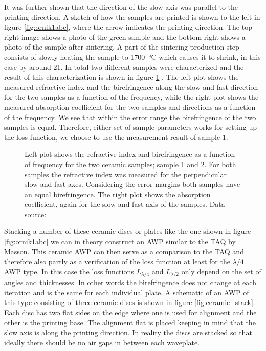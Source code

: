 It was further shown that the direction of the slow axis was parallel to the printing direction. A sketch of how the samples are printed is shown to the left in figure \ref{fig:ornik1abc}, where the arrow indicates the printing direction. The top right image shows a photo of the green sample and the bottom right shows a photo of the sample after sintering. A part of the sintering production step consists of slowly heating the sample to \SI{1700}{\celsius} which causes it to shrink, in this case by around \SI{21}{\volpercent}. In total two different samples were characterized and the result of this characterization is shown in figure \ref{fig:ri_abs} \cite{Ornik2021}. The left plot shows the measured refractive index and the birefringence along the slow and fast direction for the two samples as a function of the frequency, while the right plot shows the measured absorption coefficient for the two samples and directions as a function of the frequency. We see that within the error range the birefringence of the two samples is equal. Therefore, either set of sample parameters works for setting up the loss function, we choose to use the measurement result of sample 1. 

\begin{figure}[ht]
    \centering
    
    \caption{Left plot shows the refractive index and birefringence as a function of frequency for the two ceramic  samples; sample 1 and 2. For both samples the refractive index was measured for the perpendicular slow and fast axes. Considering the error margins both samples have an equal birefringence. The right plot shows the absorption coefficient, again for the slow and fast axis of the samples. Data source: \cite{Ornik2021}}
    \label{fig:ri_abs}
\end{figure}

Stacking a number of these ceramic discs or plates like the one shown in figure \ref{fig:ornik1abc} we can in theory construct an AWP similar to the TAQ by Masson. This ceramic AWP can then serve as a comparison to the TAQ and therefore also partly as a verification of the loss function at least for the $\lambda/4$ AWP type. In this case the loss functions $L_{\lambda/4}$ and $L_{\lambda/2}$ only depend on the set of angles and thicknesses. In other words the birefringence does not change at each iteration and is the same for each individual plate. A schematic of an AWP of this type consisting of three ceramic discs is shown in figure \ref{fig:ceramic_stack}. Each disc has two flat sides on the edge where one is used for alignment and the other is the printing base. The alignment flat is placed keeping in mind that the slow axis is along the printing direction. In reality the discs are stacked so that ideally there should be no air gaps in between each waveplate.

